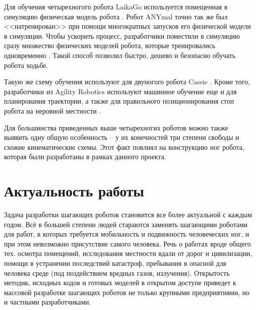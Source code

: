 Для обучения четырехногого робота LaikaGo используется помещенная в симуляцию физическая модель робота \cite{LaikaGo2019}. Робот ANYmal точно так же был <<натренирован>> при помощи многократных запусков его физической модели в симуляции. Чтобы ускорить процесс, разработчики поместили в симуляцию сразу множество физических моделей робота, которые тренировались одновременно \cite{RoboSysLab2019}. Такой способ позволил быстро, дешево и безопасно обучать робота ходьбе. 

Такую же схему обучения используют для двуногого робота Cassie \cite{AgilityRobo2018}. Кроме того, разработчики из Agility Robotics используют машинное обучение еще и для планирования траектории, а также для правильного позиционирования стоп робота на неровной местности \cite{Agility2020}.

Для большинства приведенных выше четырехногих роботов можно также выявить одну общую особенность -- у их конечностей три степени свободы и схожие кинематические схемы. Этот факт повлиял на конструкцию ног робота, которая были разработаны в рамках данного проекта.

\section*{Актуальность работы}

Задача разработки шагающих роботов становится все более актуальной с каждым годом. Всё в большей степени людей стараются заменять шагающими роботами для работ, в которых требуется мобильность и подвижность человеческих ног, и при этом невозможно присутствие самого человека. Речь о работах вроде общего тех. осмотра помещений, исследования местности вдали от дорог и цивилизации, помощи в устранении последствий катастроф, пребывания в опасной для человека среде (под поздействием вредных газов, излучения). Открытость методик, исходных кодов и готовых моделей в открытом доступе приведет к массовой разработке шагающих роботов не только крупными предприятиями, но и частными разработчиками.

